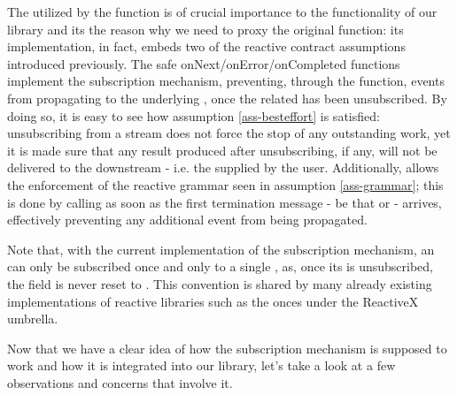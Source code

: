 

The  utilized by the  function is of crucial importance to the functionality of our library and its the reason why we need to proxy the original  function: its implementation, in fact, embeds two of the reactive contract assumptions introduced previously. The safe onNext/onError/onCompleted functions implement the subscription mechanism, preventing, through the  function, events from propagating to the underlying , once the related  has been unsubscribed. By doing so, it is easy to see how assumption \ref{ass-besteffort} is satisfied: unsubscribing from a stream does not force the stop of any outstanding work, yet it is made sure that any result produced after unsubscribing, if any, will not be delivered to the downstream  - i.e. the  supplied by the user. Additionally,  allows the enforcement of the reactive grammar seen in assumption \ref{ass-grammar}; this is done by calling  as soon as the first termination message - be that  or  - arrives, effectively preventing any additional event from being propagated.

Note that, with the current implementation of the subscription mechanism, an  can only be subscribed once and only to a single , as, once its  is unsubscribed, the  field is never reset to . This convention is shared by many already existing implementations of reactive libraries such as the onces under the ReactiveX umbrella\cite{rxjava-wiki}.

Now that we have a clear idea of how the subscription mechanism is supposed to work and how it is integrated into our library, let's take a look at a few observations and concerns that involve it. 

